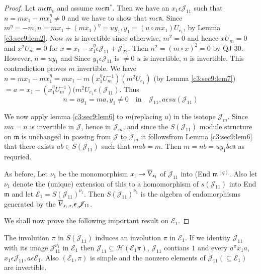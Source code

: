 \begin{proof}
Let $m\epsilon \mathfrak{m}_o$ and assume $m\epsilon
\mathfrak{m}^{\ast}$. Then we have an $x_1\epsilon \mathscr{J}_{11}$
such that $n=mx_1-mx_1^{\eta}\neq 0$ and we have to show that
$m\epsilon \mathfrak{n}$. Since
$m^{\eta}=-m,n=mx_1+(mx_1)^{\eta}=uy_1, y_1=(u \circ mx_1)U_{e_1}$, by
Lemma \ref{c3:sec9:lem2}. Now $m$ is invertible since otherwise, $m^{2}=0$ and hence
$xU_m=0$ and $x^{2}U_m=0$ for $x=x_1-x_1^{\eta}\epsilon
\mathscr{J}_{11}+\mathscr{J}_{22}$. Then $n^{2}=(m\circ x)^{2}=0$ by
QJ 30. However, $n=uy_1$ and Since $y_1\epsilon \mathscr{J}_{11}$ is
$\neq 0$ $u$ is invertible, $n$ is invertible. This contradiction
proves $m$ invertible. We have
$n=mx_1-mx_1^{\eta}=mx_1-m(x^{\eta}_1U^{-1}_m)(m^{2}U_{e_1})$ (by
Lemma \ref{c3:sec9:lem7})$=a=x_1-(x^{\eta}_{1}U^{-1}_m)(m^{2}U_{e_1}\epsilon 
  (\mathscr{J}_{11})$. Thus
\begin{equation*}
  n=uy_1=ma,y_1\neq 0\quad {\text{in}}\quad \mathscr{J}_{11},a\epsilon
  su(\mathscr{J}_{11})\tag{31}\label{c3:eq31} 
\end{equation*}

We now apply lemma \ref{c3:sec9:lem6} to $m$(replacing $u$) in the isotope
$\mathscr{J}_m$. Since $ma=n$ is invertible in $\mathscr{J}$, hence in
$\mathscr{J}_m$, and since the $S(\mathscr{J}_{11})$ module structure
on $\mathfrak{m}$ is unchanged in passing from $\mathscr{J}$ to
$\mathscr{J}_m$ it follows\pageoriginale from Lemma \ref{c3:sec9:lem6}
that there 
exists $ab\in  S(\mathscr{J}_{11})$ such that $mab=m$. Then
$m=nb=uy_1b\epsilon \mathfrak{n}$ as requried.

As before, Let $\nu_1$ be the monomorphism $x_1\to \overline{V}_{x_1}$ of
$\mathscr{J}_{11}$ into (End $\mathfrak{m}^{(q)}$. Also let $\nu_1$
denote the (unique) extension of this to a homomorphism of
$s(\mathscr{J}_{11})$ into End $\mathfrak{m}$ and let
$\mathcal{E}_1=S(\mathscr{J}_{11})^{\nu_1}$. Then
$S(\mathscr{J}_{11})^{\nu_1}$ is the algebra of endomorphisms
generated by the $\overline{V}_{x_1,x_1}\epsilon \mathscr{J}_{11}$.

We shall now prove the following important result on $\mathcal{E}_1$.
\end{proof}

\begin{lemma}\label{c3:sec9:lem9}
The involution $\pi$ in $S(\mathscr{J}_{11})$ induces an involution
$\pi$ in $\mathcal{E}_1$. If we identity $\mathscr{J}_{11}$ with its
image $\mathscr{J}_{11}^{\nu_1}$ in $\mathcal{E}_1$ then
$\mathscr{J}_{11}\subseteq \mathscr{H}(\mathcal{E}_1\pi)$,
$\mathscr{J}_{11}$ contians $1$ and every $a^{\pi}x_1a$, $x_1\epsilon
\mathscr{J}_{11}, a\epsilon\mathcal{E}_1$. Also $(\mathcal{E}_1,\pi)$ is
simple and the nonzero elements of $\mathscr{J}_{11}(\subseteq
\mathcal{E}_1)$ are invertible.
\end{lemma}

